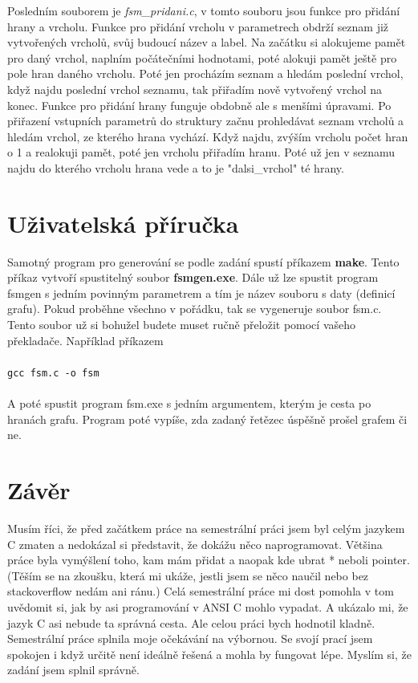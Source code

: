 \documentclass[czech,SP]{thesiskiv}
\begin{document}
{Posledním souborem je \textit{fsm\_pridani.c}, v tomto souboru jsou funkce pro přidání hrany a vrcholu. Funkce pro přidání vrcholu v parametrech obdrží seznam již vytvořených vrcholů, svůj budoucí název a label. Na začátku si alokujeme pamět pro daný vrchol, naplním počátečními hodnotami, poté alokuji pamět ještě pro pole hran daného vrcholu. Poté jen procházím seznam a hledám poslední vrchol, když najdu poslední vrchol seznamu, tak přiřadím nově vytvořený vrchol na konec. Funkce pro přidání hrany funguje obdobně ale s menšími úpravami. Po přiřazení vstupních parametrů do struktury začnu prohledávat seznam vrcholů a hledám vrchol, ze kterého hrana vychází. Když najdu, zvýším vrcholu počet hran o 1 a realokuji pamět, poté jen vrcholu přiřadím hranu. Poté už jen v seznamu najdu do kterého vrcholu hrana vede a to je "dalsi\_vrchol" té hrany.}

\chapter{Uživatelská příručka}
{Samotný program pro generování se podle zadání spustí příkazem \textbf{make}. Tento příkaz vytvoří spustitelný soubor \textbf{fsmgen.exe}. Dále už lze spustit program fsmgen s jedním povinným parametrem a tím je název souboru s daty (definicí grafu). Pokud proběhne všechno v pořádku, tak se vygeneruje soubor fsm.c. Tento soubor už si bohužel budete muset ručně přeložit pomocí vašeho překladače. Například příkazem }\\ \\
\texttt{gcc fsm.c -o fsm} \\ \\
{A poté spustit program fsm.exe s jedním argumentem, kterým je cesta po hranách grafu. Program poté vypíše, zda zadaný řetězec úspěšně prošel grafem či ne.}


\chapter{Závěr}
{Musím říci, že před začátkem práce na semestrální práci jsem byl celým jazykem C zmaten a nedokázal si představit, že dokážu něco naprogramovat. Většina práce byla vymýšlení toho, kam mám přidat a naopak kde ubrat * neboli pointer. (Těším se na zkoušku, která mi ukáže, jestli jsem se něco naučil nebo bez stackoverflow nedám ani ránu.) Celá semestrální práce mi dost pomohla v tom uvědomit si, jak by asi programování v ANSI C mohlo vypadat. A ukázalo mi, že jazyk C asi nebude ta správná cesta. Ale celou práci bych hodnotil kladně. Semestrální práce splnila moje očekávání na výbornou. Se svojí prací jsem spokojen i když určitě není ideálně řešená a mohla by fungovat lépe. Myslím si, že zadání jsem splnil správně.  }
\end{document}
